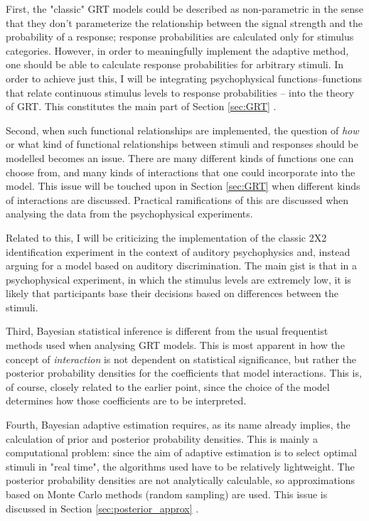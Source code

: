 \documentclass{article}\usepackage{knitr}
\begin{document}
First, the "classic" GRT models could be described as non-parametric in the sense that they don't parameterize the relationship between the signal strength and the probability of a response; response probabilities are calculated only for stimulus categories. However, in order to meaningfully implement the adaptive method, one should be able to calculate response probabilities for arbitrary stimuli. In order to achieve just this, I will be integrating psychophysical functions--functions that relate continuous stimulus levels to response probabilities \citep[Chapter 4]{kingdomprins2010}-- into the theory of GRT. This constitutes the main part of Section \ref{sec:GRT} \textit{}.  

Second, when such functional relationships are implemented, the question of \textit{how} or what kind of functional relationships between stimuli and responses should be modelled becomes an issue. There are many different kinds of functions one can choose from, and many kinds of interactions that one could incorporate into the model. This issue will be touched upon in Section \ref{sec:GRT} when different kinds of interactions are discussed. Practical ramifications of this are discussed when analysing the data from the psychophysical experiments. 

Related to this, I will be criticizing the implementation of the classic 2X2 identification experiment in the context of auditory psychophysics and, instead arguing for a model based on auditory discrimination. The main gist is that in a psychophysical experiment, in which the stimulus levels are extremely low, it is likely that participants base their decisions based on differences between the stimuli.

Third, Bayesian statistical inference is different from the usual frequentist methods used when analysing GRT models. This is most apparent in how the concept of \textit{interaction} is not dependent on statistical significance, but rather the posterior probability densities for the coefficients that model interactions. This is, of course, closely related to the earlier point, since the choice of the model determines how those coefficients are to be interpreted. 

Fourth, Bayesian adaptive estimation requires, as its name already implies, the calculation of prior and posterior probability densities. This is mainly a computational problem: since the aim of adaptive estimation is to select optimal stimuli in "real time", the algorithms used have to be relatively lightweight. The posterior probability densities are not analytically calculable, so approximations based on Monte Carlo methods (random sampling) are used. This issue is discussed in Section \ref{sec:posterior_approx} \textit{}.
\end{document}
